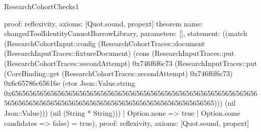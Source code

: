 \begin{lexlean}{ResearchCohortChecks1}
\begin{semanticmodule}
{ proof: reflexivity{},
 axioms: [Quot.sound, propext]
}
theorem{
 name: changedToolIdentityCannotBorrowLibrary,
 parameters: [],
 statement: ((match (ResearchCohortInput::config (ResearchCohortTraces::document (ResearchInputTraces::fixtureDocument) (cons (ResearchInputTraces::put (ResearchCohortTraces::secondAttempt) 0x746f6f6c73 (ResearchInputTraces::put (CoreBinding::get (ResearchCohortTraces::secondAttempt) 0x746f6f6c73) 0x6c65786c65616e (ctor Json::Value.string 0x65656565656565656565656565656565656565656565656565656565656565656565656565656565656565656565656565656565656565656565656565656565))) (nil Json::Value))) (nil (String * String))) | Option.none => true | Option.some candidates => false) = true),
 proof: reflexivity{},
 axioms: [Quot.sound, propext]
}
\end{semanticmodule}
\end{lexlean}
